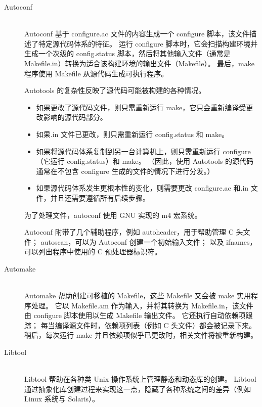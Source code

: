 \begin{description}
  \item[Autoconf] \hfill \\
    Autoconf 基于 configure.ac 文件的内容生成一个 configure 脚本，该文件描述了特定源代码体系的特征。
    运行 configure 脚本时，它会扫描构建环境并生成一个次级的 config.status 脚本，然后将其他输入文件（通常是 Makefile.in）转换为适合该构建环境的输出文件（Makefile）。
    最后，make 程序使用 Makefile 从源代码生成可执行程序。

    Autotools 的复杂性反映了源代码可能被构建的各种情况。

    \begin{itemize}
      \item 如果更改了源代码文件，则只需重新运行 make，它只会重新编译受更改影响的源代码部分。
      \item 如果.in 文件已更改，则只需重新运行 config.status 和 make。
      \item 如果将源代码体系复制到另一台计算机上，则只需重新运行 configure（它运行 config.status）和 make。
        （因此，使用 Autotools 的源代码通常在不包含 configure 生成的文件的情况下进行分发。）
      \item 如果源代码体系发生更根本性的变化，则需要更改 configure.ac 和.in 文件，并且还需要遵循所有后续步骤。
    \end{itemize}

    为了处理文件，autoconf 使用 GNU 实现的 m4 宏系统。

    Autoconf 附带了几个辅助程序，例如 autoheader，用于帮助管理 C 头文件；
    autoscan，可以为 Autoconf 创建一个初始输入文件；
    以及 ifnames，可以列出程序中使用的 C 预处理器标识符。

  \item[Automake] \hfill \\
    Automake 帮助创建可移植的 Makefile，这些 Makefile 又会被 make 实用程序处理。
    它以 Makefile.am 作为输入，并将其转换为 Makefile.in，该文件由 configure 脚本使用以生成 Makefile 输出文件。
    它还执行自动依赖项跟踪；
    每当编译源文件时，依赖项列表（例如 C 头文件）都会被记录下来。
    稍后，每次运行 make 并且依赖项似乎已更改时，相关文件将被重新构建。

  \item[Libtool] \hfill \\
    Libtool 帮助在各种类 Unix 操作系统上管理静态和动态库的创建。
    Libtool 通过抽象化库创建过程来实现这一点，隐藏了各种系统之间的差异（例如 Linux 系统与 Solaris）。
\end{description}

